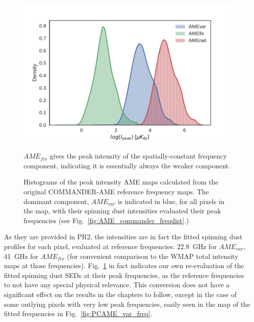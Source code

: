           \begin{figure}
           \includegraphics[width=\textwidth]{../Plots/ch_allsky/AME_comps_distplot.pdf}
           \centering
           \caption{Histograms of the peak intensity AME maps calculated from the original COMMANDER-AME reference frequency maps. The dominant component, $AME_{var}$ is indicated in blue, for all pixels in the map, with their spinning dust intensities evaluated their peak frequencies (see Fig.~\ref{fig:AME_commander_freqdist}.)}  $AME_{fix}$ gives the peak intensity of the spatially-constant frequency component, indicating it is essentially always the weaker component.
           \label{fig:AME_comps_distplot}
          \end{figure}
           As they are provided in PR2, the intensities are in fact the fitted spinning dust profiles for each pixel, evaluated at reference frequencies: 22.8~GHz for $AME_{var}$, 41~GHz for $AME_{fix}$ (for convenient comparison to the WMAP total intensity maps at those frequencies). Fig.~\ref{fig:AME_comps_distplot} in fact indicates our own re-evaluation of the fitted spinning dust SEDs at their peak frequencies, as the reference frequencies to not have any special physical relevance. This conversion does not have a significant effect on the results in the chapters to follow, except in the case of some outlying pixels with very low peak frequencies, easily seen in the map of the fitted frequencies in Fig.~\ref{fig:PCAME_var_freq}.
